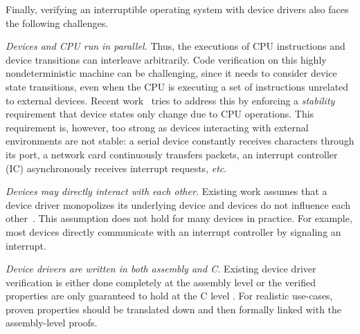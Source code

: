Finally, verifying an interruptible operating system with device
drivers also faces the following challenges.

{\em Devices and CPU run in parallel.} Thus, the executions of CPU
instructions and device transitions can interleave arbitrarily. Code
verification on this highly nondeterministic machine can be
challenging, since it needs to consider device state transitions, even
when the CPU is executing a set of instructions unrelated to external
devices. Recent
work~\cite{Alkassar:OSVE09,Alkassar:VSTTE08-225,Alkassar:VSTTE2010-71}
tries to address this by enforcing a {\it stability} requirement
that device states only change due to CPU operations. 
%
%
This requirement is, however, 
too strong as devices interacting with 
external environments are not stable: a serial device constantly
receives characters through its port, a network card continuously
transfers packets, an interrupt controller (IC) asynchronously
receives interrupt requests, {\it etc}.

{\em Devices may directly interact with each other.} Existing work
assumes that a device driver monopolizes its underlying device and
devices do not influence each other~\cite{Alkassar:VSTTE08-225}. This
assumption does not hold for many devices in practice. For example,
most devices directly communicate with an interrupt controller by
signaling an interrupt.

{\em Device drivers are written in both assembly and C.}  Existing
device driver verification is either done completely at the assembly
level \cite{Alkassar:VSTTE08-225,duan2013} or the verified properties
are only guaranteed to hold at the C level \cite{Ryzhyk_09,Ryzhyk14}.
For realistic use-cases, proven properties should be 
translated down and then formally linked with
the assembly-level proofs.

